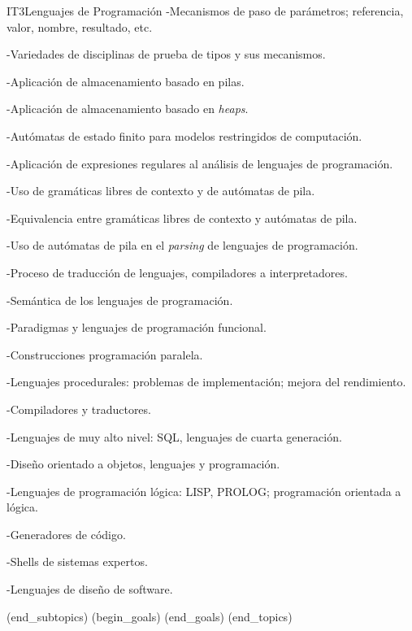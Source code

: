 \begin{BKL2}{IT3}{Lenguajes de Programación}
-Mecanismos de paso de parámetros; referencia, valor, nombre, resultado, etc.

-Variedades de disciplinas de prueba de tipos y sus mecanismos.

-Aplicación de almacenamiento basado en pilas.

-Aplicación de almacenamiento basado en \textit{heaps}.

-Autómatas de estado finito para modelos restringidos de computación.

-Aplicación de expresiones regulares al análisis de lenguajes de programación.

-Uso de gramáticas libres de contexto y de autómatas de pila.

-Equivalencia entre gramáticas libres de contexto y autómatas de pila.

-Uso de autómatas de pila en el \textit{parsing} de lenguajes de programación.

-Proceso de traducción de lenguajes, compiladores a interpretadores.

-Semántica de los lenguajes de programación.

-Paradigmas y lenguajes de programación funcional.

-Construcciones programación paralela.

-Lenguajes procedurales: problemas de implementación; mejora del rendimiento.

-Compiladores y traductores.

-Lenguajes de muy alto nivel: SQL, lenguajes de cuarta generación.

-Diseño orientado a objetos, lenguajes y programación.

-Lenguajes de programación lógica: LISP, PROLOG; programación orientada a lógica.

-Generadores de código.

-Shells de sistemas expertos.

-Lenguajes de diseño de software.

(end_subtopics)
(begin_goals)
(end_goals)
(end_topics)

\end{BKL2}
 

